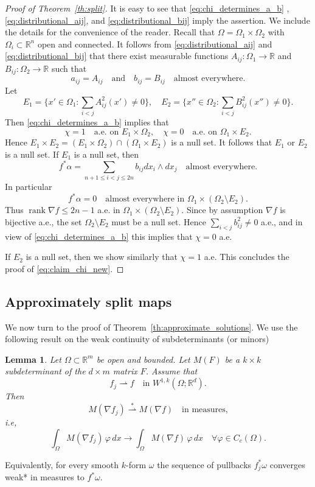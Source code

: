 \documentclass[titlepage]{amsart}
\numberwithin{equation}{section}
\theoremstyle{plain}
\newtheorem{lemma}[equation]{Lemma}
\theoremstyle{definition}
\theoremstyle{remark}
\newcommand{\R}{\mathbb{R}}
\newcommand{\rank}{\operatorname{rank}}
\newcommand{\g}{\nabla }
\begin{document}
\begin{proof}[Proof of Theorem~\ref{th:split}]
It is easy to see that \eqref{eq:chi_determines_a_b} ,  \eqref{eq:distributional_aij}, and  \eqref{eq:distributional_bij} imply the assertion.
We include the details for the convenience of the reader.
Recall that $\Omega = \Omega_1 \times \Omega_2$ with $\Omega_i \subset \R^n$ open and connected. 
It follows from \eqref{eq:distributional_aij} and \eqref{eq:distributional_bij} that there exist measurable functions
$A_{ij}: \Omega_1 \to \R$ and $B_{ij}: \Omega_2 \to \R$ such that
$$ a_{ij} = A_{ij} \quad \text{and} \quad b_{ij} = B_{ij} \quad \text{almost everywhere}.$$
Let 
$$E_1 = \{ x' \in \Omega_1 : \sum_{i < j} A_{ij}^2(x') \ne 0 \},  \quad E_2 = \{ x'' \in \Omega_2 : \sum_{i < j} B_{ij}^2(x'') \ne 0 \}.$$
Then  \eqref{eq:chi_determines_a_b} implies that
$$ \chi = 1 \quad \text{a.e. on $E_1 \times \Omega_2$},  \quad  \chi = 0 \quad \text{a.e. on $\Omega_1 \times E_2$}.$$
Hence $E_1 \times E_2 =   (E_1 \times \Omega_2) \cap (\Omega_1 \times E_2)$ is a null set. It follows that  $E_1$ or $E_2$ is a null set.
If $E_1$ is a null set,  then
$$ f^* \alpha = \sum_{n+1 \le i < j \le 2n} b_{ij} dx_i \wedge dx_j  \quad \text{almost everywhere.}$$
In particular 
$$ 
f^* \alpha = 0 \quad  \text{almost everywhere in $\Omega_1 \times (\Omega_2 \setminus E_2)$.}
$$
Thus $\rank \g f \le  2n-1$ a.e. in $\Omega_1 \times (\Omega_2 \setminus E_2)$. Since by assumption $\g f$ is bijective a.e.,
the set $\Omega_2 \setminus E_2$ must be a null set. Hence $\sum_{i < j} b_{ij}^2 \ne 0$ a.e.,  and in view of 
\eqref{eq:chi_determines_a_b} this implies
that $\chi = 0$ a.e. 

If $E_2$ is a null set, then we show similarly that $\chi =1$ a.e.
This concludes the proof of \eqref{eq:claim_chi_new}.
\end{proof}


\bigskip
\subsection{Approximately split maps} \label{se:approximately_split}
We now turn to the proof of Theorem~\ref{th:approximate_solutions}.
We use the following result on the weak continuity of subdeterminants (or minors)

\begin{lemma}   \label{le:weak_continuity} Let $\Omega \subset \R^m$ be open and bounded. Let $M(F)$ be a $k \times k$ subdeterminant
of the $d \times m$ matrix $F$. Assume that 
$$ f_j \rightharpoonup f \quad \text{in $W^{1,k}(\Omega; \R^d)$}. $$
Then
$$ M(\g f_j) \overset{*}{\rightharpoonup} M(\g f) \quad \text{in measures,} $$
i.e,
$$ \int_\Omega M(\g f_j) \, \varphi \, dx \to  \int_\Omega M(\g f) \, \varphi \, dx   \quad \forall \varphi \in C_c(\Omega).$$
\end{lemma}
Equivalently, for every smooth $k$-form $\omega$ the sequence of pullbacks $f_j^* \omega$ converges weak* in measures
to $f^*\omega$. 
\end{document}
